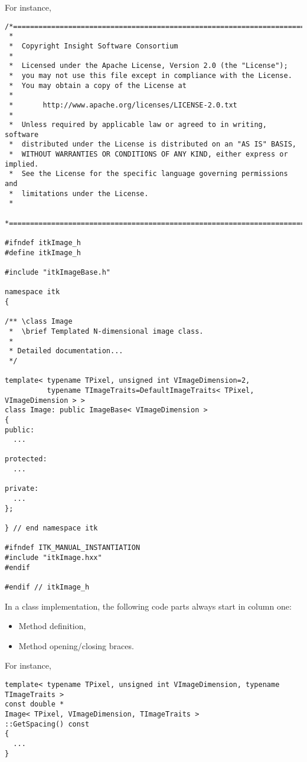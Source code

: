 For instance,

\small
\begin{verbatim}
/*=========================================================================
 *
 *  Copyright Insight Software Consortium
 *
 *  Licensed under the Apache License, Version 2.0 (the "License");
 *  you may not use this file except in compliance with the License.
 *  You may obtain a copy of the License at
 *
 *       http://www.apache.org/licenses/LICENSE-2.0.txt
 *
 *  Unless required by applicable law or agreed to in writing, software
 *  distributed under the License is distributed on an "AS IS" BASIS,
 *  WITHOUT WARRANTIES OR CONDITIONS OF ANY KIND, either express or implied.
 *  See the License for the specific language governing permissions and
 *  limitations under the License.
 *
 *=========================================================================*/

#ifndef itkImage_h
#define itkImage_h

#include "itkImageBase.h"

namespace itk
{

/** \class Image
 *  \brief Templated N-dimensional image class.
 *
 * Detailed documentation...
 */

template< typename TPixel, unsigned int VImageDimension=2,
          typename TImageTraits=DefaultImageTraits< TPixel, VImageDimension > >
class Image: public ImageBase< VImageDimension >
{
public:
  ...

protected:
  ...

private:
  ...
};

} // end namespace itk

#ifndef ITK_MANUAL_INSTANTIATION
#include "itkImage.hxx"
#endif

#endif // itkImage_h
\end{verbatim}
\normalsize

In a class implementation, the following code parts always start in column one:
\begin{itemize}
\item Method definition,
\item Method opening/closing braces.
\end{itemize}

For instance,

\small
\begin{verbatim}
template< typename TPixel, unsigned int VImageDimension, typename TImageTraits >
const double *
Image< TPixel, VImageDimension, TImageTraits >
::GetSpacing() const
{
  ...
}
\end{verbatim}
\normalsize

